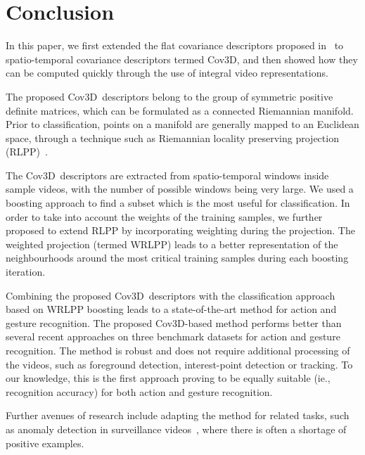 \documentclass[10pt,twocolumn,letterpaper]{article}
\newcommand{\cov}{{Cov3D}}
\begin{document}
\section{Conclusion}
\label{sec:discussion}


In this paper, we first extended the flat covariance descriptors proposed in~\cite{TuzelEtAl2008}
to spatio-temporal covariance descriptors termed \cov,
and then showed how they can be computed quickly through the use of integral video representations. 

The proposed \cov~descriptors belong to the group of symmetric positive definite matrices,
which can be formulated as a connected Riemannian manifold.
Prior to classification, points on a manifold are generally mapped to an Euclidean space,
through a technique such as Riemannian locality preserving projection (RLPP)~\cite{HarandiEtAl2012}.

The \cov~descriptors are extracted from spatio-temporal windows inside sample videos,
with the number of possible windows being very large.
We used a boosting approach to find a subset which is the most useful for classification.
In order to take into account the weights of the training samples,
we further proposed to extend RLPP by incorporating weighting during the projection.
The weighted projection (termed WRLPP) leads to a better representation of the
neighbourhoods around the most critical training samples during each boosting iteration.

Combining the proposed \cov~descriptors with the classification approach based on WRLPP boosting
leads to a state-of-the-art method for action and gesture recognition.
The proposed \cov-based method performs better than several recent approaches 
on three benchmark datasets for action and gesture recognition.
The method is robust and does not require additional processing of the videos,
such as foreground detection, interest-point detection or tracking.
To our knowledge, this is the first approach proving to be equally suitable (ie.,  recognition accuracy)
for both action and gesture recognition.


Further avenues of research include adapting the method for related tasks,
such as anomaly detection in surveillance videos~\cite{reddy_cvprw_2011},
where there is often a shortage of positive examples.




\balance
\renewcommand{\baselinestretch}{0.983}\small\footnotesize
\footnotesize


\end{document}
